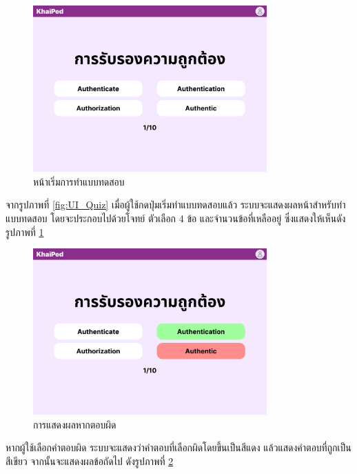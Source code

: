 \documentclass[12pt,oneside,openright,a4paper]{cpe-thai-project}
\begin{document}
\pagebreak
\begin{figure}[!h]\centering
	\includegraphics[width=0.8\textwidth, keepaspectratio=true]{image/chap3/ui/quiz/Quiz - Start.png}
	\caption{หน้าเริ่มการทำแบบทดสอบ}\label{fig:UI_QuizStart}
\end{figure}
\hspace{1cm}
จากรูปภาพที่ \ref{fig:UI_Quiz} เมื่อผู้ใช้กดปุ่มเริ่มทำแบบทดสอบแล้ว ระบบจะแสดงผลหน้าสำหรับทำแบบทดสอบ โดยจะประกอบไปด้วยโจทย์
ตัวเลือก 4 ข้อ และจำนวนข้อที่เหลืออยู่ ซึ่งแสดงให้เห็นดังรูปภาพที่ \ref{fig:UI_QuizStart}

\begin{figure}[!h]\centering
	\includegraphics[width=0.8\textwidth, keepaspectratio=true]{image/chap3/ui/quiz/Quiz - Wrong Answer.png}
	\caption{การแสดงผลหากตอบผิด}\label{fig:UI_QuizWrong}
\end{figure}
\hspace{1cm}
หากผู้ใช้เลือกคำตอบผิด ระบบจะแสดงว่าคำตอบที่เลือกผิดโดยขึ้นเป็นสีแดง แล้วแสดงคำตอบที่ถูกเป็นสีเขียว จากนั้นจะแสดงผลข้อถัดไป ดังรูปภาพที่ \ref{fig:UI_QuizWrong}
\end{document}
